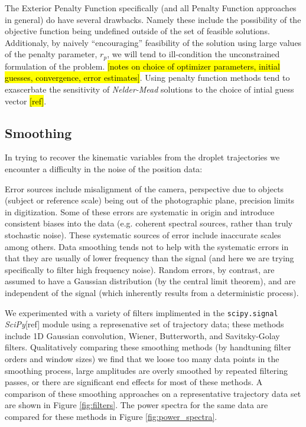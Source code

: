 \documentclass[10pt,a4paper]{article}
\begin{document}
The Exterior Penalty Function specifically (and all Penalty Function approaches in general) do have several drawbacks. Namely these include the possibility of the objective function being undefined outside of the set of feasible solutions. Additionaly, by naively ``encouraging'' feasibility of the solution using large values of the penalty parameter, $r_p$, we will tend to ill-condition the unconstrained formulation of the problem.
\hl{[notes on choice of optimizer parameters, initial guesses, convergence, error estimates]}. Using penalty function methods tend to exascerbate the sensitivity of \emph{Nelder-Mead} solutions to the choice of intial guess vector \hl{[ref]}. 

\subsection*{Smoothing}
In trying to recover the kinematic variables from the droplet trajectories we encounter a difficulty in the noise of the position data:

Error sources include misalignment of the camera, perspective due to objects (subject or reference scale) being out of the photographic plane, precision limits in digitization. Some of these errors are systematic in origin and introduce consistent biases into the data (e.g. coherent spectral sources, rather than truly stochastic noise). These systematic sources of error include inaccurate scales among others. Data smoothing tends not to help with the systematic errors in that they are usually of lower frequency than the signal (and here we are trying specifically to filter high frequency noise). Random errors, by contrast, are assumed to have a Gaussian distribution (by the central limit theorem), and are independent of the signal (which inherently results from a deterministic process).

We experimented with a variety of filters implimented in the \verb|scipy.signal| \emph{SciPy}[ref] module using a represenative set of trajectory data; these methods include 1D Gaussian convolution, Wiener, Butterworth, and Savitsky-Golay filters. Qualitatively comparing these smoothing methods (by handtuning filter orders and window sizes) we find that we loose too many data points in the smoothing process, large amplitudes are overly smoothed by repeated filtering passes, or there are significant end effects for most of these methods. A comparison of these smoothing approaches on a representative trajectory data set are shown in Figure \ref{fig:filters}. The power spectra for the same data are compared for these methods in Figure \ref{fig:power_spectra}.
\end{document}
